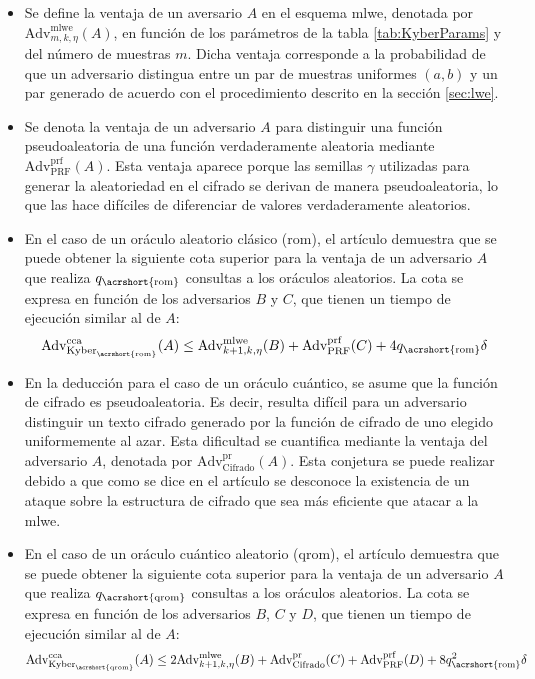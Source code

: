\begin{itemize}
	\item Se define la ventaja de un aversario \(A\) en el esquema \acrshort{mlwe}, denotada por 
	\(\text{Adv}^{\text{mlwe}}_{m,k,\eta}(A)\), en función de los parámetros 
	de la tabla \ref{tab:KyberParams} y del número de muestras \(m\). 
	Dicha ventaja corresponde a la probabilidad de que un adversario 
	distingua entre un par de muestras uniformes \((a,b)\) y un par 
	generado de acuerdo con el procedimiento descrito en la 
	sección \ref{sec:lwe}.
	\item Se denota la ventaja de un adversario \(A\) para distinguir una función pseudoaleatoria de una función verdaderamente aleatoria mediante 
	\(\text{Adv}^{\text{prf}}_{\text{PRF}}(A)\). 
	Esta ventaja aparece porque las semillas \(\gamma\) utilizadas para generar la aleatoriedad en el cifrado
	se derivan de manera pseudoaleatoria, lo que las hace difíciles de diferenciar de valores verdaderamente aleatorios.
	\item En el caso de un oráculo aleatorio clásico (\acrshort{rom}), el artículo demuestra que se puede obtener la siguiente cota superior para la ventaja de un adversario \(A\) que realiza \(q_{\text{\acrshort{rom}}}\) consultas a los oráculos aleatorios. La cota se expresa en función de los adversarios \(B\) y \(C\), que tienen un tiempo de ejecución similar al de \(A\):
	\begin{equation}
		\text{Adv}^{\text{cca}}_{\text{Kyber}_{\text{\acrshort{rom}}}}(A)
		\le \text{Adv}^{\text{mlwe}}_{k+1,k,\eta}(B)+ \text{Adv}^{\text{prf}}_{\text{PRF}}(C)+4q_{\text{\acrshort{rom}}}\delta
	\end{equation}
	\item En la deducción para el caso de un oráculo cuántico, se asume que la función de cifrado es pseudoaleatoria. Es decir, resulta difícil para un adversario distinguir un texto cifrado generado por la función de cifrado de uno elegido uniformemente al azar. 
	Esta dificultad se cuantifica mediante la ventaja del adversario \(A\), denotada por \(\text{Adv}^{\text{pr}}_{\text{Cifrado}}(A)\). Esta conjetura se puede realizar debido a que como se dice en el artículo se desconoce la existencia de un ataque sobre la estructura de cifrado que sea más eficiente que atacar a la \acrshort{mlwe}.
	\item En el caso de un oráculo cuántico aleatorio (\acrshort{qrom}), el artículo demuestra que se puede obtener la siguiente cota superior para la ventaja de un adversario \(A\) que realiza \(q_{\text{\acrshort{qrom}}}\) consultas a los oráculos aleatorios. La cota se expresa en función de los adversarios \(B\), \(C\) y \(D\), que tienen un tiempo de ejecución similar al de \(A\):
	\begin{equation}
		\text{Adv}^{\text{cca}}_{\text{Kyber}_{\text{\acrshort{qrom}}}}(A)
		\le 2\text{Adv}^{\text{mlwe}}_{k+1,k,\eta}(B)+
		\text{Adv}^{\text{pr}}_{\text{Cifrado}}(C)+ \text{Adv}^{\text{prf}}_{\text{PRF}}(D)+8q_{\text{\acrshort{rom}}}^2\delta
	\end{equation}
\end{itemize}

